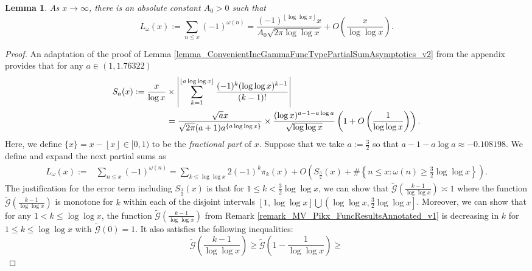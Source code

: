 \documentclass[11pt,reqno,a4letter]{article}
\numberwithin{figure}{section}
\numberwithin{table}{section}
\newcommand{\floor}[1]{\left\lfloor #1 \right\rfloor}
\theoremstyle{plain}
\newtheorem{lemma}[theorem]{Lemma}
\numberwithin{theorem}{section}
\theoremstyle{definition}
\begin{document}
\begin{lemma} 
\label{cor_AsymptoticsForSignedSumsOfomegan_v1}
As $x \rightarrow \infty$, there is an absolute constant $A_0 > 0$ such that 
\[
L_{\omega}(x) := \sum_{n \leq x} (-1)^{\omega(n)} = 
     \frac{(-1)^{\floor{\log\log x}} x}{A_0 \sqrt{2\pi \log\log x}} + 
     O\left(\frac{x}{\log\log x}\right). 
\]
\end{lemma}
\begin{proof}
An adaptation of the proof of Lemma \ref{lemma_ConvenientIncGammaFuncTypePartialSumAsymptotics_v2} 
from the appendix provides that for any $a \in (1, 1.76322)$ 
\begin{align}
\notag 
S_a(x) := 
     \frac{x}{\log x} & \times \left\lvert \sum_{k=1}^{\floor{a\log\log x}} \frac{(-1)^{k} (\log\log x)^{k-1}}{(k-1)!} 
     \right\rvert \\ 
\label{eqn_ConvenientIncGammaFuncTypePartialSumAsymptotics_va3} 
     & = \frac{\sqrt{a} x}{\sqrt{2\pi}(a+1) a^{\{a\log\log x\}}} 
     \times \frac{(\log x)^{a-1-a\log a}}{\sqrt{\log\log x}} 
     \left(1 + O\left(\frac{1}{\log\log x}\right)\right). 
\end{align}
Here, we define $\{x\} = x - \floor{x} \in [0, 1)$ to be the \emph{fractional part} of $x$. 
Suppose that we take $a := \frac{3}{2}$ so that $a-1-a\log a \approx -0.108198$. 
We define and expand the next partial sums as 
\begin{align*}
L_{\omega}(x) := & \sum_{n \leq x} (-1)^{\omega(n)} = 
     \sum_{k \leq \log\log x} 2 (-1)^{k} \pi_k(x) + 
     O\left(S_{\frac{3}{2}}(x) + 
     \#\left\{n \leq x: \omega(n) \geq \frac{3}{2}\log\log x\right\}\right). 
\end{align*} 
The justification for the error term including $S_{\frac{3}{2}}(x)$ is that for 
$1 \leq k < \frac{3}{2}\log\log x$, we can show that 
$\widetilde{\mathcal{G}}\left(\frac{k-1}{\log\log x}\right) \asymp 1$ where the function 
$\widetilde{\mathcal{G}}\left(\frac{k-1}{\log\log x}\right)$ is monotone for $k$ within 
each of the disjoint intervals $[1, \log\log x] \bigcup \left(\log\log x, \frac{3}{2}\log\log x\right]$. 
Moreover, we can show that for any $1 < k \leq \log\log x$, 
the function $\widetilde{\mathcal{G}}\left(\frac{k-1}{\log\log x}\right)$ from 
Remark \ref{remark_MV_Pikx_FuncResultsAnnotated_v1} is decreasing in $k$ for $1 \leq k \leq \log\log x$ 
with $\widetilde{\mathcal{G}}(0) = 1$. It also satisfies the following inequalities:  
\[ 
\widetilde{\mathcal{G}}\left(\frac{k-1}{\log\log x}\right) \geq 
     \widetilde{\mathcal{G}}\left(1-\frac{1}{\log\log x}\right) \geq 
\]
\end{proof}
\end{document}

